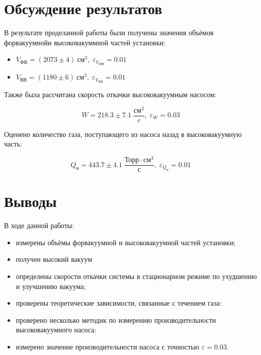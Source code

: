 \documentclass{article}
\newcommand{\x}{\text}
\begin{document}
\section*{Обсуждение результатов}

В результате проделанной работы были получены значения объёмов форвакуумнойи высоковакуммной частей установки:
\begin{itemize}
    \item $V_\text{ФВ} = (2073\pm4)~\text{см}^3, \; \varepsilon_{V_\text{ФВ}} = 0.01$
    \item $V_\text{ВВ} = (1180\pm6)~\text{см}^3, \; \varepsilon_{V_\text{ВВ}} = 0.01$
\end{itemize}

Также была рассчитана скорость откачки высоковакуумным насосом:

$$W = 218.3\pm7.1  \; \frac{\x{см}^3}{c}, \; \varepsilon_W = 0.03$$

Оценено количество газа, поступающего из насоса назад в высоковакуумную часть:

$$Q_\x{н} = 443.7\pm4.1 \; \frac{\x{Торр}\cdot\x{см}^3}{\x{с}}, \; \varepsilon_{Q_\text{н}} = 0.01$$

\section*{Выводы}

В ходе данной работы:

\begin{itemize}
    \item измерены объёмы форвакуумной и высоковакуумной частей установки;
    \item получен высокий вакуум
    \item определены скорости откачки системы в стационарном режиме по ухудшению и улучшению вакуума;
    \item проверены теоретические зависимости, связанные с течением газа:
    \item проверено несколько методик по измерению производительности высоковакуумного насоса:
    \item измерено значение производительности насоса с точностью $\varepsilon = 0.03$.
\end{itemize}
\end{document}
